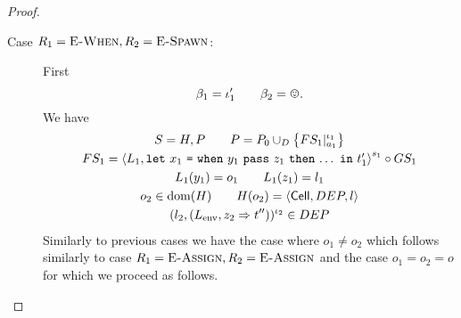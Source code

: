 \begin{proof}
\begin{description}
    \item[Case $R_1 = \mbox{{\sc E-When}}, R_2 = \mbox{\sc E-Spawn}$:] First 
      \begin{equation}
        \beta_1 = \iota'_1 \andalso \beta_2 = \smiley.
      \end{equation}
      We have
      \begin{equation}
        \begin{gathered}
          S = H, P \quad\quad P = P_0 \cup_D \left\{ FS_1|_{a_1}^{\iota_1}
          \right\} \\
          FS_1 = \mbox{$\langle L_1, \mbox{\mdseries\texttt{let}~$x_1$~\texttt{=}~$\mbox{\mdseries\texttt{when}~$y_1$~\texttt{pass}~$z_1$~\texttt{then}~$\dots$}$~\texttt{in}~$t'_1$} \rangle$}^{s_1} \circ GS_1
          \\ 
          L_1(y_1) = o_1 \quad\quad L_1(z_1) = l_1 \\
          o_2 \in \mbox{$\mathrm{dom}$}(H) \quad\quad H(o_2) = \mbox{$\langle \mbox{$\mathsf{Cell}$}{}, DEP, l \rangle$} \\
          (l_2, (L_{\text{env}}, z_2 \Rightarrow t''))^{\iota_2} \in DEP
        \end{gathered}
      \end{equation}
      Similarly to previous cases we have the case where $o_1 \neq o_2$ which
      follows similarly to case $R_1 = \mbox{{\sc E-Assign}}, R_2 = \mbox{{\sc E-Assign}}$ and the case
      $o_1 = o_2 = o$ for which we proceed as follows.


\end{description}
\end{proof}
